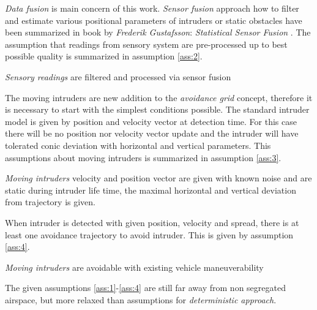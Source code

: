\noindent \emph{Data fusion} is main concern of this work. \emph{Sensor fusion} approach how to filter and estimate various positional parameters of intruders or static obstacles have been summarized in book by \emph{Frederik Gustafsson}: \emph{Statistical Sensor Fusion} \cite{gustafsson2010statistical}. The assumption that readings from sensory system are pre-processed up to best possible quality is summarized in assumption \ref{ass:2}.
\begin{assumption}\label{ass:2}\textit{Sensory readings} are filtered and processed via sensor fusion\end{assumption}

\noindent The moving intruders are new addition to the \emph{avoidance grid} concept, therefore it is necessary to start with the simplest conditions possible. The standard intruder model is given by position and velocity vector at detection time. For this case there will be no position nor velocity vector update and the intruder will have tolerated conic deviation with horizontal and vertical parameters. This assumptions about moving intruders is summarized in assumption \ref{ass:3}. 

\begin{assumption}\label{ass:3}\textit{Moving intruders} velocity and position vector are
given with known noise and are static during intruder life time, the maximal horizontal and vertical deviation from trajectory is given.\end{assumption}

\noindent When intruder is detected with given position, velocity and spread, there is at least one avoidance trajectory to avoid intruder. This is given by assumption \ref{ass:4}.
\begin{assumption}\label{ass:4}\textit{Moving intruders} are avoidable with existing vehicle maneuverability \end{assumption}

\noindent The given assumptions \ref{ass:1}-\ref{ass:4} are still far away from non segregated airspace, but more relaxed than assumptions for \emph{deterministic approach}. 
